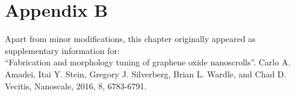 \chapter{Appendix B}
\thispagestyle{plain}
\vspace{-.5cm}

\noindent Apart from minor modifications, this chapter originally appeared as supplementary information for:\newline\\
\ssp ``Fabrication and morphology tuning of graphene oxide nanoscrolls''.
Carlo A. Amadei, Itai Y. Stein, Gregory J. Silverberg, Brian L. Wardle, and Chad D. Vecitis,  Nanoscale, 2016, 8, 6783-6791.


    \dsp


